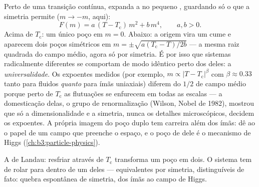 \begin{proposition}\label{prop:b3:phase-transitions:landau}
Perto de uma transição contínua, expanda a  no pequeno
, guardando só o que a simetria permite ($m \to -m$,
aqui):
\[
F(m) = a\,(T - T_{\text{c}})\,m^2 + b\,m^4 , \qquad a, b > 0 .
\]
Acima de $T_{\text{c}}$: um único poço em $m = 0$. Abaixo: a origem
vira um cume e aparecem dois poços simétricos em $m = \pm
\sqrt{a(T_{\text{c}} - T)/2b}$ --- a mesma raiz quadrada do campo
médio, agora só por simetria. É por isso que sistemas radicalmente
diferentes se comportam de modo idêntico perto dos 
deles: a \emph{universalidade}. Os expoentes medidos (por exemplo, $m \propto |T -
T_{\text{c}}|^\beta$ com $\beta \approx 0.33$ tanto para
fluidos \emph{quanto} para ímãs uniaxiais) diferem do $1/2$ de campo
médio porque perto de $T_{\text{c}}$ as flutuações se enfurecem em
todas as escalas --- a domesticação delas, o grupo de renormalização
(Wilson, Nobel de 1982), mostrou que só a dimensionalidade e a
simetria, nunca os detalhes microscópicos, decidem os expoentes. A
própria imagem do poço duplo tem carreira além dos ímãs: dê ao
 o papel de um campo que preenche o espaço, e o poço
de  dele é o mecanismo de Higgs
(\cref{ch:b3:particle-physics}).
\end{proposition}
\admitted

\begin{omfigure}

{\small A  de Landau: resfriar através de $T_{\text{c}}$
transforma um poço em dois. O sistema tem de rolar para dentro de um
deles --- equivalentes por simetria, distinguíveis de fato: quebra
espontânea de simetria, dos ímãs ao campo de Higgs.}
\end{omfigure}

